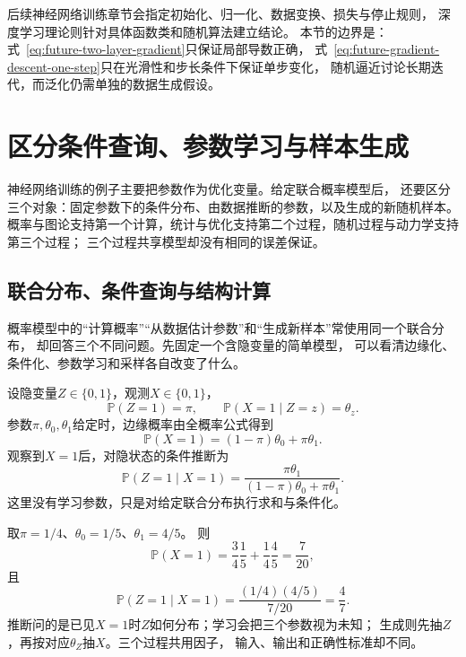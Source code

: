 后续神经网络训练章节会指定初始化、归一化、数据变换、损失与停止规则，
深度学习理论则针对具体函数类和随机算法建立结论。
本节的边界是：式~\eqref{eq:future-two-layer-gradient}只保证局部导数正确，
式~\eqref{eq:future-gradient-descent-one-step}只在光滑性和步长条件下保证单步变化，
随机逼近讨论长期迭代，而泛化仍需单独的数据生成假设。

\section{区分条件查询、参数学习与样本生成}
\label{sec:future-probabilistic-inference-learning-generation}

神经网络训练的例子主要把参数作为优化变量。给定联合概率模型后，
还要区分三个对象：固定参数下的条件分布、由数据推断的参数，以及生成的新随机样本。
概率与图论支持第一个计算，统计与优化支持第二个过程，随机过程与动力学支持第三个过程；
三个过程共享模型却没有相同的误差保证。

\subsection{联合分布、条件查询与结构计算}
\label{sec:future-joint-model-conditional-query}

概率模型中的“计算概率”“从数据估计参数”和“生成新样本”常使用同一个联合分布，
却回答三个不同问题。先固定一个含隐变量的简单模型，
可以看清边缘化、条件化、参数学习和采样各自改变了什么。

设隐变量$Z\in\{0,1\}$，观测$X\in\{0,1\}$，
\[
  \mathbb{P}(Z=1)=\pi,
  \qquad
  \mathbb{P}(X=1\mid Z=z)=\theta_z.
\]
参数$\pi,\theta_0,\theta_1$给定时，边缘概率由全概率公式得到
\[
  \mathbb{P}(X=1)
  =
  (1-\pi)\theta_0+\pi\theta_1.
\]
观察到$X=1$后，对隐状态的条件推断为
\begin{equation}
  \mathbb{P}(Z=1\mid X=1)
  =
  \frac{\pi\theta_1}
  {(1-\pi)\theta_0+\pi\theta_1}.
  \label{eq:future-latent-posterior}
\end{equation}
这里没有学习参数，只是对给定联合分布执行求和与条件化。

\begin{example}[同一联合分布上的三个问题]
  \label{ex:future-latent-three-questions}
  取$\pi=1/4$、$\theta_0=1/5$、$\theta_1=4/5$。
  则
  \[
    \mathbb{P}(X=1)
    =
    \frac{3}{4}\frac{1}{5}
    +
    \frac{1}{4}\frac{4}{5}
    =
    \frac{7}{20},
  \]
  且
  \[
    \mathbb{P}(Z=1\mid X=1)
    =
    \frac{(1/4)(4/5)}{7/20}
    =
    \frac{4}{7}.
  \]
  推断问的是已见$X=1$时$Z$如何分布；学习会把三个参数视为未知；
  生成则先抽$Z$，再按对应$\theta_Z$抽$X$。三个过程共用因子，
  输入、输出和正确性标准却不同。
\end{example}


